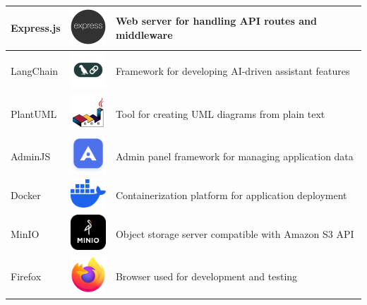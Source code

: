 \begin{longtable}{|m{3.5cm}|m{4cm}|m{6.5cm}|}
    \hline
    Express.js & \includegraphics[width=1.5cm]{pictures/web/logo/express-js.png} & Web server for handling API routes and middleware \\
    \hline
    LangChain & \includegraphics[width=1.5cm]{pictures/web/logo/langchain-icon-seeklogo.png} & Framework for developing AI-driven assistant features \\
    \hline
    PlantUML & \includegraphics[width=1.5cm]{pictures/web/logo/plantuml-svgrepo-com.png} & Tool for creating UML diagrams from plain text \\
    \hline
    AdminJS & \includegraphics[width=1.5cm]{pictures/web/logo/admin-js.png} & Admin panel framework for managing application data \\
    \hline
    Docker & \includegraphics[width=1.5cm]{pictures/web/logo/docker.png} & Containerization platform for application deployment \\
    \hline
    MinIO & \includegraphics[width=1.5cm]{pictures/web/logo/minio.png} & Object storage server compatible with Amazon S3 API \\
    \hline
    Firefox & \includegraphics[width=1.5cm]{pictures/web/logo/firefox.png} & Browser used for development and testing \\
    \hline
    \end{longtable}
       

